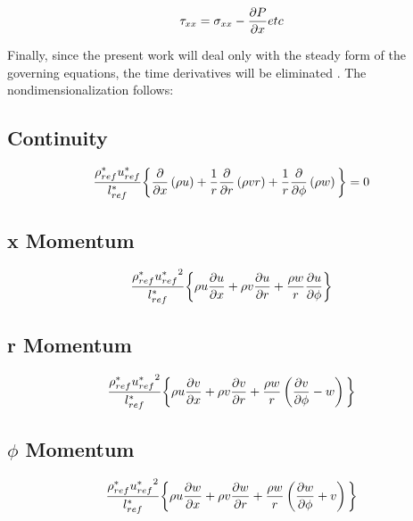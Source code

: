 \begin{equation}
\tau_{xx} = \sigma_{xx} - \pdv{P}{x} etc
\end{equation}

Finally, since the present work will deal only with the steady form of the
governing equations, the time derivatives will be eliminated . The
nondimensionalization follows:

\subsection{Continuity}

\begin{equation}
\frac{\rho^*_{ref}u^*_{ref}}{l^*_{ref}} \bigg\{
\pdv{x}\left( \rho u \right) 
+ \frac{1}{r}\pdv{r}\left( \rho v r \right)
+ \frac{1}{r}\pdv{\phi}\left(\rho w \right)
\bigg\} = 0
\end{equation}

\subsection{x Momentum}

\begin{equation}
  \frac{\rho^*_{ref}{u^*_{ref}}^2}{l^*_{ref}}\bigg\{
    \rho u \pdv{u}{x} + \rho v\pdv{u}{r} + \frac{\rho w}{r}\pdv{u}{\phi} 
  \bigg\}
\end{equation}

\subsection{r Momentum}

\begin{equation}
  \frac{\rho^*_{ref}{u^*_{ref}}^2}{l^*_{ref}}\bigg\{
    \rho u \pdv{v}{x} + \rho v\pdv{v}{r} + \frac{\rho w}{r}\left(\pdv{v}{\phi} - w\right) 
  \bigg\}
\end{equation}

\subsection{$\phi$ Momentum}

\begin{equation}
  \frac{\rho^*_{ref}{u^*_{ref}}^2}{l^*_{ref}}\bigg\{
    \rho u \pdv{w}{x} + \rho v\pdv{w}{r} + \frac{\rho w}{r}\left(\pdv{w}{\phi} + v\right) 
  \bigg\}
\end{equation}


